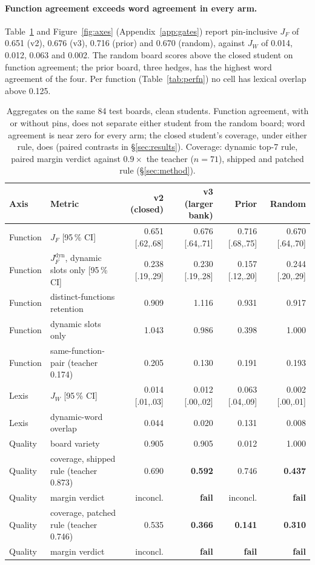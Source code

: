 \paragraph{Function agreement exceeds word agreement in every arm.}
Table~\ref{tab:axes} and Figure~\ref{fig:axes}
(Appendix~\ref{app:gates}) report pin-inclusive $J_F$ of
0.651 (v2), 0.676 (v3), 0.716 (prior) and 0.670 (random), against $J_W$ of
0.014, 0.012, 0.063 and 0.002. The random board scores above the closed
student on function agreement; the prior board, three hedges, has the
highest word agreement of the four. Per function
(Table~\ref{tab:perfn}) no cell has lexical overlap above 0.125.

\begin{table}[t]
\centering
\small
\caption{Aggregates on the same 84 test boards, clean students. Function
agreement, with or without pins, does not separate either student from the
random board; word agreement is near zero for every arm; the closed
student's coverage, under either rule, does (paired contrasts in
\S\ref{sec:results}). Coverage: dynamic top-7 rule, paired margin verdict
against $0.9\times$ the teacher ($n=71$), shipped and patched rule
(\S\ref{sec:method}).}
\label{tab:axes}
\footnotesize
\setlength{\tabcolsep}{4pt}
\begin{tabular}{@{}llrrrr@{}}
\toprule
Axis & Metric & v2 (closed) & v3 (larger bank) & Prior & Random \\
\midrule
Function & $J_F$ [95\,\% CI] & 0.651 [.62,.68] & 0.676 [.64,.71] & 0.716 [.68,.75] & 0.670 [.64,.70] \\
Function & $J_F^{\mathrm{dyn}}$, dynamic slots only [95\,\% CI] & 0.238 [.19,.29] & 0.230 [.19,.28] & 0.157 [.12,.20] & 0.244 [.20,.29] \\
Function & distinct-functions retention & 0.909 & 1.116 & 0.931 & 0.917 \\
Function & \quad dynamic slots only & 1.043 & 0.986 & 0.398 & 1.000 \\
Function & same-function-pair (teacher 0.174) & 0.205 & 0.130 & 0.191 & 0.193 \\
Lexis & $J_W$ [95\,\% CI] & 0.014 [.01,.03] & 0.012 [.00,.02] & 0.063 [.04,.09] & 0.002 [.00,.01] \\
Lexis & dynamic-word overlap & 0.044 & 0.020 & 0.131 & 0.008 \\
Quality & board variety & 0.905 & 0.905 & 0.012 & 1.000 \\
Quality & coverage, shipped rule (teacher 0.873) & 0.690 & \textbf{0.592} & 0.746 & \textbf{0.437} \\
Quality & \quad margin verdict & inconcl. & \textbf{fail} & inconcl. & \textbf{fail} \\
Quality & coverage, patched rule (teacher 0.746) & 0.535 & \textbf{0.366} & \textbf{0.141} & \textbf{0.310} \\
Quality & \quad margin verdict & inconcl. & \textbf{fail} & \textbf{fail} & \textbf{fail} \\
\bottomrule
\end{tabular}
\end{table}

